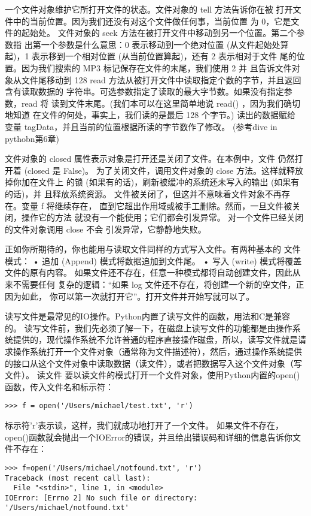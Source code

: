 \documentclass[twoside,11pt]{book}
\begin{document}
一个文件对象维护它所打开文件的状态。文件对象的 tell 方法告诉你在被 打开文件中的当前位置。因为我们还没有对这个文件做任何事，当前位置 为 0，它是文件的起始处。
文件对象的 seek 方法在被打开文件中移动到另一个位置。第二个参数指 出第一个参数是什么意思：0 表示移动到一个绝对位置 (从文件起始处算 起)，1 表示移到一个相对位置 (从当前位置算起)，还有 2 表示相对于文件 尾的位置。因为我们搜索的 MP3 标记保存在文件的末尾，我们使用 2 并 且告诉文件对象从文件尾移动到 128
read 方法从被打开文件中读取指定个数的字节，并且返回含有读取数据的
字符串。可选参数指定了读取的最大字节数。如果没有指定参数，read 将
读到文件末尾。(我们本可以在这里简单地说 read() ，因为我们确切地知道
在文件的何处，事实上，我们读的是最后 128 个字节。) 读出的数据赋给
变量 tagData，并且当前的位置根据所读的字节数作了修改。
(参考dive in pythobn第6章)

文件对象的 closed 属性表示对象是打开还是关闭了文件。在本例中，文件 仍然打开着 (closed 是 False)。
为了关闭文件，调用文件对象的 close 方法。这样就释放掉你加在文件上 的锁 (如果有的话)，刷新被缓冲的系统还未写入的输出 (如果有的话)，并 且释放系统资源。
文件被关闭了，但这并不意味着文件对象不再存在。变量 f 将继续存在， 直到它超出作用域或被手工删除。然而，一旦文件被关闭，操作它的方法 就没有一个能使用；它们都会引发异常。
对一个文件已经关闭的文件对象调用 close 不会 引发异常，它静静地失败。

正如你所期待的，你也能用与读取文件同样的方式写入文件。有两种基本的 文件模式：
• 追加 (Append) 模式将数据追加到文件尾。
• 写入 (write) 模式将覆盖文件的原有内容。 如果文件还不存在，任意一种模式都将自动创建文件，因此从来不需要任何 复杂的逻辑：“如果 log 文件还不存在，将创建一个新的空文件，正因为如此， 你可以第一次就打开它”。打开文件并开始写就可以了。


读写文件是最常见的IO操作。Python内置了读写文件的函数，用法和C是兼容的。
读写文件前，我们先必须了解一下，在磁盘上读写文件的功能都是由操作系统提供的，现代操作系统不允许普通的程序直接操作磁盘，所以，读写文件就是请求操作系统打开一个文件对象（通常称为文件描述符），然后，通过操作系统提供的接口从这个文件对象中读取数据（读文件），或者把数据写入这个文件对象（写文件）。
读文件
要以读文件的模式打开一个文件对象，使用Python内置的open()函数，传入文件名和标示符：
\begin{lstlisting}
>>> f = open('/Users/michael/test.txt', 'r')
\end{lstlisting}

标示符'r'表示读，这样，我们就成功地打开了一个文件。
如果文件不存在，open()函数就会抛出一个IOError的错误，并且给出错误码和详细的信息告诉你文件不存在：
\begin{lstlisting}
>>> f=open('/Users/michael/notfound.txt', 'r')
Traceback (most recent call last):
  File "<stdin>", line 1, in <module>
IOError: [Errno 2] No such file or directory: '/Users/michael/notfound.txt'
\end{lstlisting}
\end{document}
